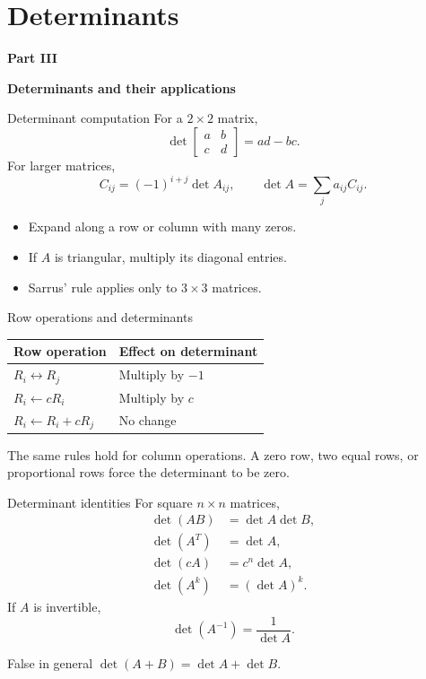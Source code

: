 \documentclass[aspectratio=169]{beamer}
\newcommand{\sectioncard}[2]{%
  \begin{frame}[plain]
    \vfill\centering
    {\Huge\color{lectureorange}\bfseries #1}\par\bigskip
    {\LARGE\color{lecturegreen}\bfseries #2}
    \vfill
  \end{frame}}
\begin{document}
\section{Determinants}
\sectioncard{Part III}{Determinants and their applications}

\begin{frame}{Determinant computation}
For a $2\times2$ matrix,
\[
\det\begin{bmatrix}a&b\\c&d\end{bmatrix}=ad-bc.
\]
For larger matrices,
\[
C_{ij}=(-1)^{i+j}\det A_{ij},
\qquad
\det A=\sum_j a_{ij}C_{ij}.
\]
\begin{itemize}
  \item Expand along a row or column with many zeros.
  \item If $A$ is triangular, multiply its diagonal entries.
  \item Sarrus' rule applies only to $3\times3$ matrices.
\end{itemize}
\end{frame}

\begin{frame}{Row operations and determinants}
\renewcommand{\arraystretch}{1.4}
\begin{center}
\begin{tabular}{>{\raggedright\arraybackslash}p{.46\linewidth}>{\raggedright\arraybackslash}p{.34\linewidth}}
\toprule
Row operation & Effect on determinant \\
\midrule
$R_i\leftrightarrow R_j$ & Multiply by $-1$ \\
$R_i\leftarrow cR_i$ & Multiply by $c$ \\
$R_i\leftarrow R_i+cR_j$ & No change \\
\bottomrule
\end{tabular}
\end{center}
The same rules hold for column operations. A zero row, two equal rows, or proportional rows force the determinant to be zero.
\end{frame}

\begin{frame}{Determinant identities}
For square $n\times n$ matrices,
\begin{align*}
\det(AB)&=\det A\det B,\\
\det(A^T)&=\det A,\\
\det(cA)&=c^n\det A,\\
\det(A^k)&=(\det A)^k.
\end{align*}
If $A$ is invertible,
\[
\det(A^{-1})=\frac{1}{\det A}.
\]
\begin{alertblock}{False in general}
$\det(A+B)=\det A+\det B$.
\end{alertblock}
\end{frame}
\end{document}
